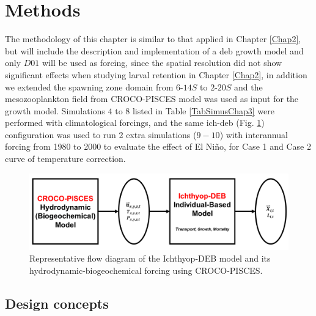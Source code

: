 \clearpage
\section{Methods}\label{Chap3Meth}
The methodology of this chapter is similar to that applied in Chapter \ref{Chap2}, but will include the description and implementation of a \acrshort{deb} growth model and only $D01$ will be used as forcing, since the spatial resolution did not show significant effects when studying larval
retention in Chapter \ref{Chap2}, in addition we extended the spawning zone domain from $6$\textdegree -$14$\textdegree $S$ to $2$\textdegree -$20$\textdegree $S$ and the mesozooplankton field from CROCO-PISCES model was used as input for the growth model. Simulations $4$ to $8$ listed in Table \ref{TabSimusChap3} were performed with climatological forcings, and the same \gls{ich-deb} (Fig. \ref{Chap3Ichthyop-DEB}) configuration was used to run 2 extra simulations ($9-10$) with interannual forcing from 1980 to 2000 to evaluate the effect of El Ni\~{n}o, for Case 1 and Case 2 curve of temperature correction.\\

\begin{figure}[ht]
	\includegraphics[width=1.0\textwidth]{figures/Chap3Ichthyop-DEB.png}
	\centering
	\caption{Representative flow diagram of the Ichthyop-DEB model and its hydrodynamic-biogeochemical forcing using CROCO-PISCES.}
	\label{Chap3Ichthyop-DEB}
\end{figure}

\subsection{Design concepts}

